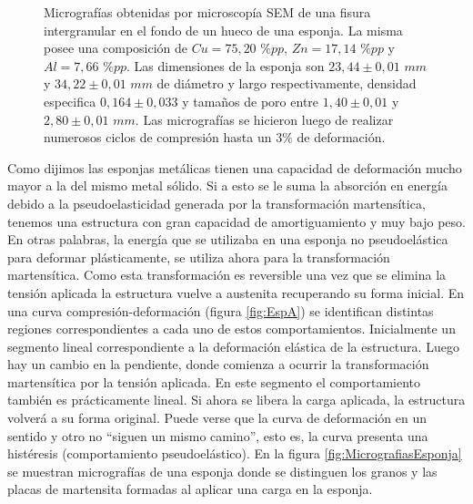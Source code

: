 \documentclass[a4paper,12pt,fleqn,twoside,openany]{book}
\begin{document}
\begin{figure}[h]
\begin{subfigure}{0.45\textwidth}
        \caption{}
        \label{fig:EspAa}
    \end{subfigure}
  \caption{Micrografías obtenidas por microscopía SEM de una fisura intergranular en el fondo de un hueco de una esponja. La misma posee una composición de $Cu=75,20$ $\%pp$, $Zn=17,14$ $\%pp$ y $Al=7,66$ $\%pp$. Las dimensiones de la esponja son $23,44 \pm0,01$ $mm$ y $34,22 \pm0,01$ $mm$ de diámetro y largo respectivamente, densidad especifica $0,164 \pm 0,033$ y tamaños de poro entre $1,40 \pm 0,01$ y $2,80 \pm 0,01$ $mm$. Las micrografías se hicieron luego de realizar numerosos ciclos de compresión hasta un $3\%$ de deformación.}
  \label{fig:FisuraEsponja}
  \end{figure}

Como dijimos las esponjas metálicas tienen una capacidad de deformación mucho mayor a la del mismo metal sólido. Si a esto se le suma la absorción en energía 
debido a la pseudoelasticidad generada por la transformación martensítica, tenemos una estructura con gran capacidad de amortiguamiento y muy bajo 
peso. En otras palabras, la energía que se utilizaba en una esponja no pseudoelástica para deformar plásticamente, se utiliza ahora para la transformación
martensítica. Como esta transformación es reversible una vez que se elimina la tensión aplicada la estructura vuelve a austenita recuperando su forma 
inicial. En una curva compresión-deformación (figura \ref{fig:EspA}) se identifican distintas regiones correspondientes a cada uno de estos comportamientos. Inicialmente un 
segmento lineal correspondiente a la deformación elástica de la estructura. Luego hay un cambio en la pendiente, donde comienza a ocurrir 
la transformación martensítica por la tensión aplicada. En este segmento el comportamiento también es prácticamente lineal. Si ahora se libera la carga 
aplicada, la estructura volverá a su forma original. Puede verse que la curva de deformación en un sentido y otro no “siguen un mismo camino”, esto es, 
la curva presenta una histéresis (comportamiento pseudoelástico). En la figura \ref{fig:MicrografiasEsponja} se muestran micrografías de una esponja donde se distinguen los granos y las placas de martensita formadas al aplicar una carga en la esponja.
\end{document}
